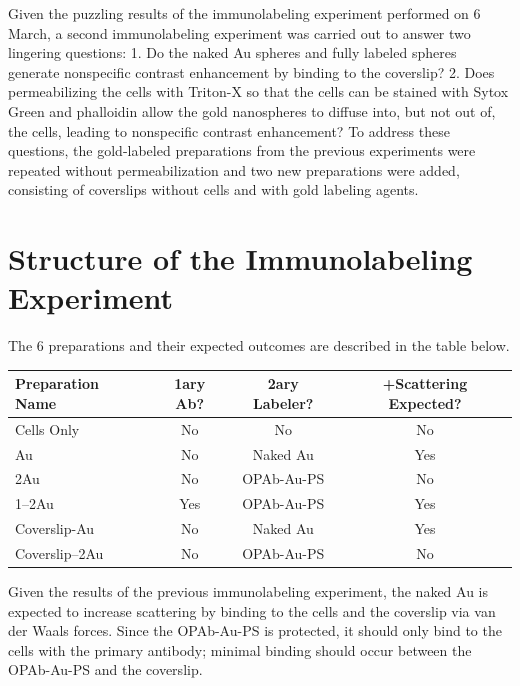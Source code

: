 Given the puzzling results of the immunolabeling experiment performed on 6 March, a second immunolabeling experiment was carried out to answer two lingering questions:
1. Do the naked Au spheres and fully labeled spheres generate nonspecific contrast enhancement by binding to the coverslip?
2. Does permeabilizing the cells with Triton-X so that the cells can be stained with Sytox Green and phalloidin allow the gold nanospheres to diffuse into, but not out of, the cells, leading to nonspecific contrast enhancement?
To address these questions, the gold-labeled preparations from the previous experiments were repeated without permeabilization and two new preparations were added, consisting of coverslips without cells and with gold labeling agents.

\section{Structure of the Immunolabeling Experiment}
\label{structureoftheimmunolabelingexperiment}

The 6 preparations and their expected outcomes are described in the table below.

\begin{table}[htbp]
\begin{minipage}{\linewidth}
\setlength{\tymax}{0.5\linewidth}
\centering
\small
\begin{tabular}{@{}lccc@{}} \toprule
Preparation Name&1ary Ab?&2ary Labeler?&+Scattering Expected?\\
\midrule
Cells Only&No&No&No\\
Au&No&Naked Au&Yes\\
2Au&No&OPAb-Au-PS&No\\
1--2Au&Yes&OPAb-Au-PS&Yes\\
Coverslip-Au&No&Naked Au&Yes\\
Coverslip--2Au&No&OPAb-Au-PS&No\\

\bottomrule

\end{tabular}
\end{minipage}
\end{table}


Given the results of the previous immunolabeling experiment, the naked Au is expected to increase scattering by binding to the cells and the coverslip via van der Waals forces. Since the OPAb-Au-PS is protected, it should only bind to the cells with the primary antibody; minimal binding should occur between the OPAb-Au-PS and the coverslip. 

